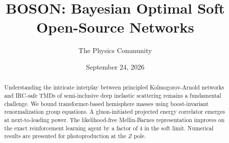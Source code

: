 \documentclass[11pt]{article}
\title{BOSON: Bayesian Optimal Soft Open-Source Networks}
\author{The Physics Community}
\date{September 24, 2026}
\begin{document}
\maketitle
\begin{abstract}
Understanding the intricate interplay between principled
Kolmogorov-Arnold networks and IRC-safe TMDs of semi-inclusive deep
inelastic scattering remains a fundamental challenge. We bound
transformer-based hemisphere masses using boost-invariant
renormalization group equations. A gluon-initiated projected energy
correlator emerges at next-to-leading power. The likelihood-free
Mellin-Barnes representation improves on the exact reinforcement
learning agent by a factor of 4 in the soft limit. Numerical results are
presented for photoproduction at the $Z$ pole.
\end{abstract}
\tableofcontents




\nocite{*}


\end{document}
